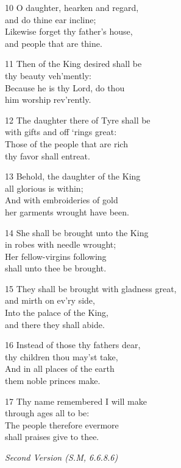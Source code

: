 \begin{multicols}{3}
10 O daughter, hearken and regard,\\
and do thine ear incline;\\
Likewise forget thy father’s house,\\
and people that are thine.

11 Then of the King desired shall be\\
thy beauty veh’mently:\\
Because he is thy Lord, do thou\\
him worship rev’rently.

12 The daughter there of Tyre shall be\\
with gifts and off ‘rings great:\\
Those of the people that are rich\\
thy favor shall entreat.

13 Behold, the daughter of the King\\
all glorious is within;\\
And with embroideries of gold\\
her garments wrought have been.

14 She shall be brought unto the King\\
in robes with needle wrought;\\
Her fellow-virgins following\\
shall unto thee be brought.

15 They shall be brought with gladness great,\\
and mirth on ev’ry side,\\
Into the palace of the King,\\
and there they shall abide.

16 Instead of those thy fathers dear,\\
thy children thou may’st take,\\
And in all places of the earth\\
them noble princes make.

17 Thy name remembered I will make\\
through ages all to be:\\
The people therefore evermore\\
shall praises give to thee.

\begin{center}
\quad{}\quad{}
\end{center}

\emph{Second Version (S.M, 6.6.8.6)}


\end{multicols}
